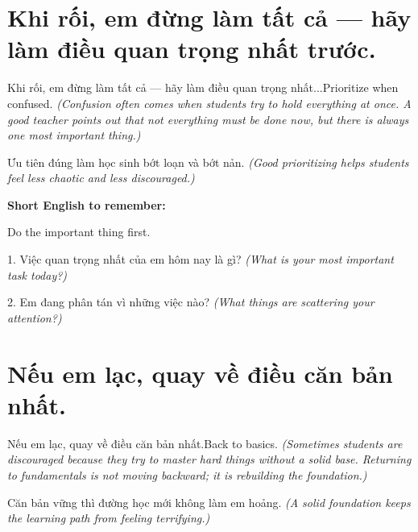 \section{Khi rối, em đừng làm tất cả — hãy làm điều quan trọng nhất trước.}
\begin{truyen}{Khi rối, em đừng làm tất cả — hãy làm điều quan trọng nhất...}{Prioritize when confused.}
\textit{(Confusion often comes when students try to hold everything at once. A good teacher points out that not everything must be done now, but there is always one most important thing.)}
\end{truyen}

\begin{baihoc}
Ưu tiên đúng làm học sinh bớt loạn và bớt nản.
\textit{(Good prioritizing helps students feel less chaotic and less discouraged.)}
\end{baihoc}

\begin{ghinhoanh}
\textbf{Short English to remember:}

Do the important thing first.

\end{ghinhoanh}

\begin{tuhocnhanh}
1. Việc quan trọng nhất của em hôm nay là gì? \textit{(What is your most important task today?)}

2. Em đang phân tán vì những việc nào? \textit{(What things are scattering your attention?)}
\end{tuhocnhanh}
\ngancach


\section{Nếu em lạc, quay về điều căn bản nhất.}
\begin{truyen}{Nếu em lạc, quay về điều căn bản nhất.}{Back to basics.}
\textit{(Sometimes students are discouraged because they try to master hard things without a solid base. Returning to fundamentals is not moving backward; it is rebuilding the foundation.)}
\end{truyen}

\begin{baihoc}
Căn bản vững thì đường học mới không làm em hoảng.
\textit{(A solid foundation keeps the learning path from feeling terrifying.)}
\end{baihoc}

